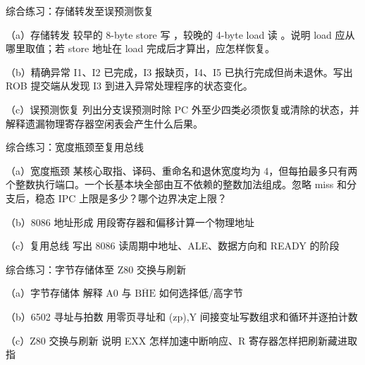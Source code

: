 \begin{chapterexercise}{综合练习：存储转发至误预测恢复}
\begin{exercisesubproblem}{（a）存储转发}
较早的 8-byte store 写 ，较晚的 4-byte load 读 。说明 load 应从哪里取值；若 store 地址在 load 完成后才算出，应怎样恢复。
\end{exercisesubproblem}
\begin{exercisesubproblem}{（b）精确异常}
I1、I2 已完成，I3 报缺页，I4、I5 已执行完成但尚未退休。写出 ROB 提交端从发现 I3 到进入异常处理程序的状态变化。
\end{exercisesubproblem}
\begin{exercisesubproblem}{（c）误预测恢复}
列出分支误预测时除 PC 外至少四类必须恢复或清除的状态，并解释遗漏物理寄存器空闲表会产生什么后果。
\end{exercisesubproblem}
\end{chapterexercise}

\begin{chapterexercise}{综合练习：宽度瓶颈至复用总线}
\begin{exercisesubproblem}{（a）宽度瓶颈}
某核心取指、译码、重命名和退休宽度均为 4，但每拍最多只有两个整数执行端口。一个长基本块全部由互不依赖的整数加法组成。忽略 miss 和分支后，稳态 IPC 上限是多少？哪个边界决定上限？
\end{exercisesubproblem}
\begin{exercisesubproblem}{（b）8086 地址形成}
用段寄存器和偏移计算一个物理地址
\end{exercisesubproblem}
\begin{exercisesubproblem}{（c）复用总线}
写出 8086 读周期中地址、ALE、数据方向和 READY 的阶段
\end{exercisesubproblem}
\end{chapterexercise}

\begin{chapterexercise}{综合练习：字节存储体至 Z80 交换与刷新}
\begin{exercisesubproblem}{（a）字节存储体}
解释 A0 与 \(\overline{\mathrm{BHE}}\) 如何选择低/高字节
\end{exercisesubproblem}
\begin{exercisesubproblem}{（b）6502 寻址与拍数}
用零页寻址和 (zp),Y 间接变址写数组求和循环并逐拍计数
\end{exercisesubproblem}
\begin{exercisesubproblem}{（c）Z80 交换与刷新}
说明 EXX 怎样加速中断响应、R 寄存器怎样把刷新藏进取指
\end{exercisesubproblem}
\end{chapterexercise}

